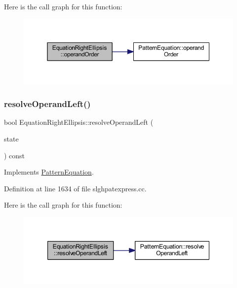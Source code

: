 Here is the call graph for this function\+:
\nopagebreak
\begin{figure}[H]
\begin{center}
\leavevmode
\includegraphics[width=350pt]{class_equation_right_ellipsis_a43707cb523898b0a1b7d7cc1c7dbb779_cgraph}
\end{center}
\end{figure}
\mbox{\label{class_equation_right_ellipsis_aa6d5d32c1f6da5d4ecffe983221d1497}} 
\subsubsection{\texorpdfstring{resolveOperandLeft()}{resolveOperandLeft()}}
{\footnotesize\ttfamily bool Equation\+Right\+Ellipsis\+::resolve\+Operand\+Left (\begin{DoxyParamCaption}\item[{\mbox{\hyperlink{struct_operand_resolve}{Operand\+Resolve}} \&}]{state }\end{DoxyParamCaption}) const\hspace{0.3cm}{\ttfamily [virtual]}}



Implements \mbox{\hyperlink{class_pattern_equation_a16e885a945df91e3daf2dea6394ae6f2}{Pattern\+Equation}}.



Definition at line 1634 of file slghpatexpress.\+cc.

Here is the call graph for this function\+:
\nopagebreak
\begin{figure}[H]
\begin{center}
\leavevmode
\includegraphics[width=347pt]{class_equation_right_ellipsis_aa6d5d32c1f6da5d4ecffe983221d1497_cgraph}
\end{center}
\end{figure}


